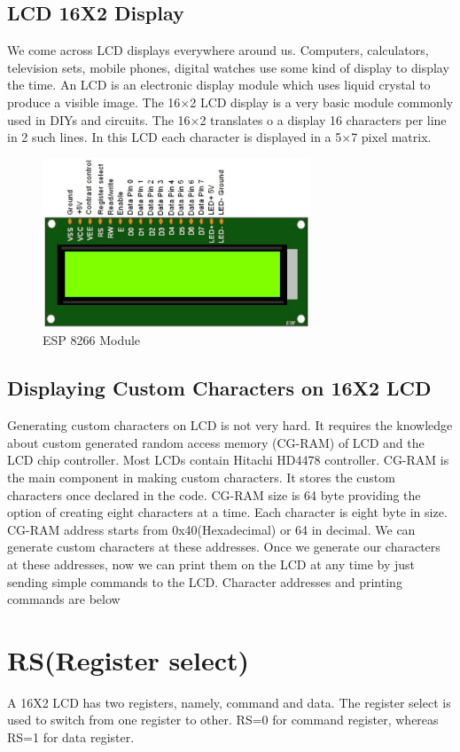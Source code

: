 \documentclass[twoside,a4paper,16pt]{book}
\begin{document}
{\begin{itemize}
\end{itemize}
\subsection{LCD 16X2 Display }


We come across LCD displays everywhere around us. Computers, calculators, television sets, mobile phones, digital watches use some kind of display to display the time. An LCD is an electronic display module which uses liquid crystal to produce a visible image. The 16×2 LCD display is a very basic module commonly used in DIYs and circuits. The 16×2 translates o a display 16 characters per line in 2 such lines. In this LCD each character is displayed in a 5×7 pixel matrix.
\begin{figure}[ht!]
	\begin{center}
		\includegraphics[width=8.0cm]{17.png}
		\caption{ESP 8266 Module}
	\end{center}
\end{figure}
\subsection*{Displaying Custom Characters on 16X2 LCD}
Generating custom characters on LCD is not very hard. It requires the knowledge about custom generated random access memory (CG-RAM) of LCD and the LCD chip controller. Most LCDs contain Hitachi HD4478 controller. CG-RAM is the main component in making custom characters. It stores the custom characters once declared in the code. CG-RAM size is 64 byte providing the option of creating eight characters at a time. Each character is eight byte in size.
CG-RAM address starts from 0x40(Hexadecimal) or 64 in decimal. We can generate custom characters at these addresses. Once we generate our characters at these addresses, now we can print them on the LCD at any time by just sending simple commands to the LCD. Character addresses and printing commands are below
\section*{RS(Register select)}
A 16X2 LCD has two registers, namely, command and data. The register select is used to switch from one register to other. RS=0 for command register, whereas RS=1 for data register.

}
\end{document}
